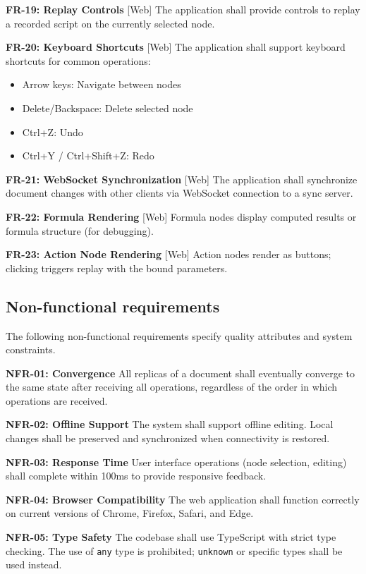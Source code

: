 \documentclass{article}
\begin{document}
\textbf{FR-19: Replay Controls} [Web] The application shall provide controls to replay a recorded script on the currently selected node.

\textbf{FR-20: Keyboard Shortcuts} [Web] The application shall support keyboard shortcuts for common operations:
\begin{itemize}
\setlength{\itemsep}{-5pt}
\item Arrow keys: Navigate between nodes
\item Delete/Backspace: Delete selected node
\item Ctrl+Z: Undo
\item Ctrl+Y / Ctrl+Shift+Z: Redo
\end{itemize}

\textbf{FR-21: WebSocket Synchronization} [Web] The application shall synchronize document changes with other clients via WebSocket connection to a sync server.

\textbf{FR-22: Formula Rendering} [Web] Formula nodes display computed results or formula structure (for debugging).

\textbf{FR-23: Action Node Rendering} [Web] Action nodes render as buttons; clicking triggers replay with the bound parameters.


\subsection{Non-functional requirements}

The following non-functional requirements specify quality attributes and system constraints.

\textbf{NFR-01: Convergence} All replicas of a document shall eventually converge to the same state after receiving all operations, regardless of the order in which operations are received.

\textbf{NFR-02: Offline Support} The system shall support offline editing. Local changes shall be preserved and synchronized when connectivity is restored.

\textbf{NFR-03: Response Time} User interface operations (node selection, editing) shall complete within 100ms to provide responsive feedback.

\textbf{NFR-04: Browser Compatibility} The web application shall function correctly on current versions of Chrome, Firefox, Safari, and Edge.

\textbf{NFR-05: Type Safety} The codebase shall use TypeScript with strict type checking. The use of \texttt{any} type is prohibited; \texttt{unknown} or specific types shall be used instead.
\end{document}

